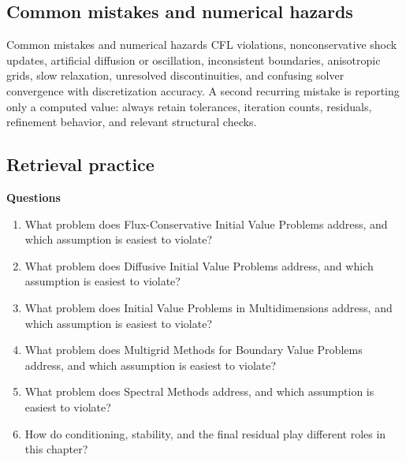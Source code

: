 \documentclass[10pt,letterpaper]{article}
\begin{document}
\subsection*{Common mistakes and numerical hazards}
\begin{warnbox}{Common mistakes and numerical hazards}
CFL violations, nonconservative shock updates, artificial diffusion or oscillation, inconsistent boundaries, anisotropic grids, slow relaxation, unresolved discontinuities, and confusing solver convergence with discretization accuracy.  A second recurring mistake is reporting only a computed value: always retain tolerances, iteration counts, residuals, refinement behavior, and relevant structural checks.
\end{warnbox}

\subsection*{Retrieval practice}
\textbf{Questions}
\begin{enumerate}
\item What problem does Flux-Conservative Initial Value Problems address, and which assumption is easiest to violate?
\item What problem does Diffusive Initial Value Problems address, and which assumption is easiest to violate?
\item What problem does Initial Value Problems in Multidimensions address, and which assumption is easiest to violate?
\item What problem does Multigrid Methods for Boundary Value Problems address, and which assumption is easiest to violate?
\item What problem does Spectral Methods address, and which assumption is easiest to violate?
\item How do conditioning, stability, and the final residual play different roles in this chapter?
\end{enumerate}
\end{document}
